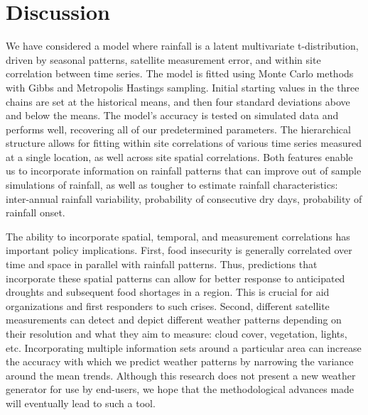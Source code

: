 \documentclass[12pt]{article}
\begin{document}

\section{Discussion}
\label{sec:discussion}

We have considered a model where rainfall is a latent multivariate t-distribution, driven by seasonal patterns, satellite measurement error, and within site correlation between time series. The model is fitted using Monte Carlo methods with Gibbs and Metropolis Hastings sampling. Initial starting values in the three chains are set at the historical means, and then four standard deviations above and below the means. The model's accuracy is tested on simulated data and performs well, recovering all of our predetermined parameters. The hierarchical structure allows for fitting within site correlations of various time series measured at a single location, as well across site spatial correlations. Both features enable us to incorporate information on rainfall patterns that can improve out of sample simulations of rainfall, as well as tougher to estimate rainfall characteristics: inter-annual rainfall variability, probability of consecutive dry days, probability of rainfall onset.

The ability to incorporate spatial, temporal, and measurement correlations has important policy implications. First, food insecurity is generally correlated over time and space in parallel with rainfall patterns. Thus, predictions that incorporate these spatial patterns can allow for better response to anticipated droughts and subsequent food shortages in a region. This is crucial for aid organizations and first responders to such crises. Second, different satellite measurements can detect and depict different weather patterns depending on their resolution and what they aim to measure: cloud cover, vegetation, lights, etc. Incorporating multiple information sets around a particular area can increase the accuracy with which we predict weather patterns by narrowing the variance around the mean trends. Although this research does not present a new weather generator for use by end-users, we hope that the methodological advances made will eventually lead to such a tool. 
\end{document}
